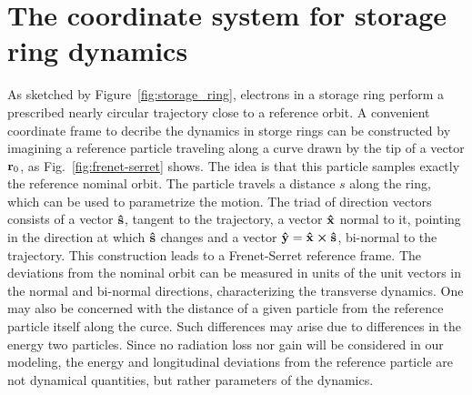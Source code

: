 
\section{The coordinate system for storage ring dynamics}
As sketched by Figure~\ref{fig:storage_ring}, electrons in a storage ring perform a prescribed nearly circular trajectory close to a reference orbit. A convenient coordinate frame to decribe the dynamics in storge rings can be constructed by imagining a reference particle traveling along a curve drawn by the tip of a vector $\vb{r}_0$, as Fig.~\ref{fig:frenet-serret} shows. The idea is that this particle samples exactly the reference nominal orbit. The particle travels a distance $s$ along the ring, which can be used to parametrize the motion. The triad of direction vectors consists of a vector $\vu{s}$, tangent to the trajectory, a vector $\vu{x}$ normal to it, pointing in the direction at which $\vu{s}$ changes and a vector $\vu{y}=\vu{x}\cross\vu{s}$, bi-normal to the trajectory. This construction leads to a Frenet-Serret reference frame. The deviations from the nominal orbit can be measured in units of the unit vectors in the normal and bi-normal directions, characterizing the transverse dynamics. One may also be concerned with the distance of a given particle from the reference particle itself along the curce. Such differences may arise due to differences in the energy two particles. Since no radiation loss nor gain will be considered in our modeling, the energy and longitudinal deviations from the reference particle are not dynamical quantities, but rather parameters of the dynamics.

